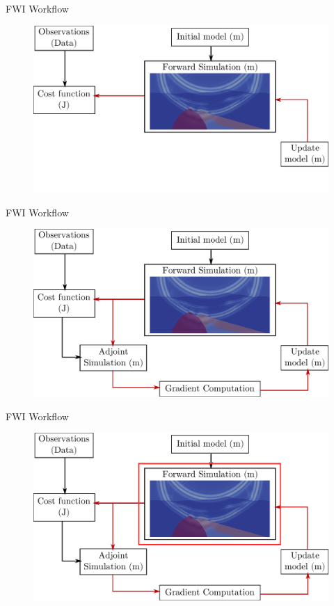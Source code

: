 \begin{frame}[noframenumbering]{FWI Workflow}
\begin{figure}
  \includegraphics[scale=0.31]{fwi_test2.pdf}
\end{figure}
\end{frame}


\begin{frame}[noframenumbering]{FWI Workflow}
\begin{figure}
  \includegraphics[scale=0.31]{fwi_test.pdf}
\end{figure}
\end{frame}

\begin{frame}[noframenumbering]{FWI Workflow}
\begin{figure}
  \includegraphics[scale=0.31]{fwi_test3.pdf}
\end{figure}
\end{frame}



